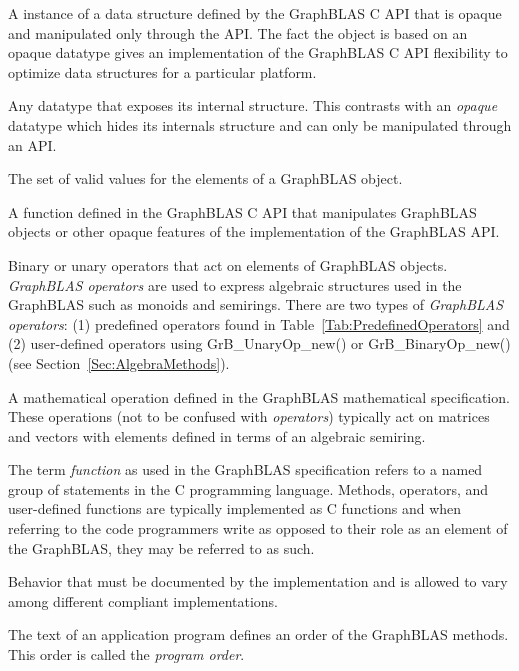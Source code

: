   A instance of a data structure defined by the GraphBLAS C
API that is opaque and manipulated only through the API.  The fact the object
is based on an opaque datatype gives an implementation of the GraphBLAS C API
flexibility to optimize data structures for a particular platform.

 Any datatype that exposes its internal structure.   This contrasts
with an \emph{opaque} datatype which hides its internals structure and can only
be manipulated through an API.

 The set of valid values for the elements of a GraphBLAS object.

 A function defined in the GraphBLAS C API that manipulates
GraphBLAS objects or other opaque features of the implementation of the GraphBLAS API.

 Binary or unary operators that act on elements of GraphBLAS objects.  \emph{GraphBLAS operators} are used to express algebraic structures used in the GraphBLAS such as monoids and semirings. There are two types of \emph{GraphBLAS operators}: (1) predefined operators found in Table~\ref{Tab:PredefinedOperators} and (2) user-defined operators using {\sf GrB\_UnaryOp\_new()} or {\sf GrB\_BinaryOp\_new()} (see Section~\ref{Sec:AlgebraMethods}).

 A mathematical operation defined in the
GraphBLAS mathematical specification. These operations (not to be confused with \emph{operators}) typically act
on matrices and vectors with elements defined in terms of an algebraic semiring. 

 The term \emph{function} as used in the GraphBLAS specification
refers to a named group of statements in the C programming language.  Methods, operators,
and user-defined functions are typically implemented as C functions and when referring to 
the code programmers write as opposed to their role as an element of the GraphBLAS, they may
be referred to as such.

 Behavior that must be documented
by the implementation and is allowed to vary among different
compliant implementations. 

 The text of an application program defines an order
of the GraphBLAS methods. This order is called the \emph{program order}.

